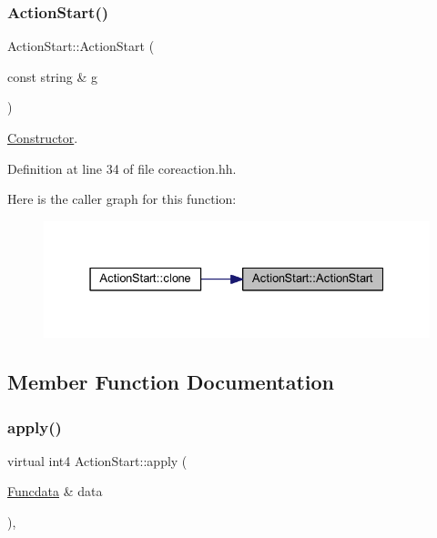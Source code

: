\subsubsection{\texorpdfstring{ActionStart()}{ActionStart()}}
{\footnotesize\ttfamily Action\+Start\+::\+Action\+Start (\begin{DoxyParamCaption}\item[{const string \&}]{g }\end{DoxyParamCaption})\hspace{0.3cm}{\ttfamily [inline]}}



\mbox{\hyperlink{class_constructor}{Constructor}}. 



Definition at line 34 of file coreaction.\+hh.

Here is the caller graph for this function\+:
\nopagebreak
\begin{figure}[H]
\begin{center}
\leavevmode
\includegraphics[width=331pt]{class_action_start_a837fbad221311d5407cd64f1cab9654f_icgraph}
\end{center}
\end{figure}


\subsection{Member Function Documentation}
\mbox{\label{class_action_start_a9e21953bb17c18610189c3d28b1ab0a9}} 
\subsubsection{\texorpdfstring{apply()}{apply()}}
{\footnotesize\ttfamily virtual int4 Action\+Start\+::apply (\begin{DoxyParamCaption}\item[{\mbox{\hyperlink{class_funcdata}{Funcdata}} \&}]{data }\end{DoxyParamCaption})\hspace{0.3cm}{\ttfamily [inline]}, {\ttfamily [virtual]}}



